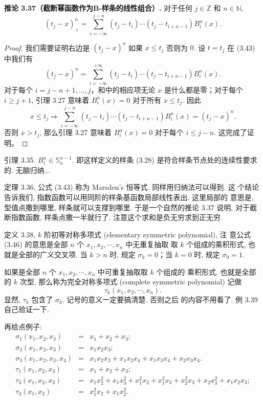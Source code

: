 \documentclass[a4paper]{ctexart}
\begin{document}
{\noindent \textbf{推论 3.37（截断幂函数作为B-样条的线性组合）.} 对于任何 $j \in \mathbb{Z}$ 和 $n \in \mathbb{N}$,
\[
(t_j - x)_+^n = \sum_{i=-\infty}^{j-n} (t_j - t_i) \cdots (t_j - t_{i+n-1}) B_i^n(x). \tag{3.45}
\]

\begin{proof}
我们需要证明右边是 $(t_j - x)^n$ 如果 $x \leq t_j$ 否则为 $0$. 设 $t=t_j$ 在 (3.43) 中我们有
\[
  (t_j - x)^n = \sum_{i=-\infty}^{+\infty} (t_j - t_i) \cdots (t_j - t_{i+n-1}) B_i^n(x).
\]
对于每个 $i = j - n + 1, \ldots, j$，和中的相应项无论 $x$ 是什么都是零；对于每个 $i \geq j + 1$, 引理 3.27 意味着 $B_i^n(x) = 0$ 对于所有 $x \leq t_j$. 
因此
\[
  x \leq t_j \Longrightarrow \sum_{i=-\infty}^{j-n} (t_j - t_i) \cdots (t_j - t_{i+n-1}) B_i^n(x) = (t_j - x)^n.
\]
否则 $x > t_j$, 那么引理 3.27 意味着 $B_i^n(x) = 0$ 对于每个 $i \leq j - n$. 这完成了证明。
\end{proof}

引理 3.35. $B_i^n \in \mathbb{S}_n^{n - 1}$. 即这样定义的样条 (3.28)
是符合样条节点处的连续性要求的. 无脑归纳...

定理 3.36, 公式 (3.43) 称为 Marsden's 恒等式. 同样用归纳法可以得到. 这
个结论告诉我们, 指数函数可以用同阶的样条基函数局部线性表出. 这里局部的
意思是, 型值点撒到哪里, 样条就可以支撑到哪里. 于是一个自然的推论 3.37
说明, 对于截断指数函数, 样条点撒一半就行了. 注意这个求和是负无穷求到正无穷.

定义 3.38, $k$ 阶初等对称多项式 (elementary symmetric polynomial), 注
意公式(3.46) 的意思是全部 $n$ 个 $x_1, x_2, \cdots, x_n$ 中无重复抽取
取 $k$ 个组成的乘积形式, 也就是全部的广义交叉项. 当 $k > n$ 时,
规定 $\sigma_k = 0$；当 $k = 0$ 时, 规定 $\sigma_0 = 1$.

如果是全部 $n$ 个 $x_1, x_2, \cdots, x_n$ 中可重复抽取取 $k$ 个组成的
乘积形式, 也就是全部的 $k$ 次型, 那么称为完全对称多项式 (complete
symmetric polynomial) 记做
$$
\tau_k(x_1, x_2, \cdots, x_n).
$$
显然, $\tau_k$ 包含了 $\sigma_k$. 记号的意义一定要搞清楚. 否则之后
的内容不用看了. 例 3.39 自己验证一下.

再给点例子:
$$
\begin{array}{rcl}
  \sigma_1(x_1, x_2, x_3) &=& x_1 + x_2 + x_3; \\
  \sigma_3(x_1, x_2, x_3) &=& x_1x_2x_3; \\
  \sigma_3(x_1, x_2, x_3, x_4) &=& x_1x_2x_3 + x_1x_2x_4 + x_1x_3x_4 + x_2x_3x_4.\\
  \tau_1(x_1, x_2, x_3) &=& x_1 + x_2 + x_3;\\
  \tau_3(x_1, x_2, x_3) &=& x_1x_2^2 + x_1x_3^2 + x_1^2x_2 + x_1^2x_3 + x_2^2x_3 + x_2x_3^2 + x_1x_2x_3;\\
  \tau_3(x_1, x_2) &=& x_1^2x_2 + x_1x_2^2.
\end{array}
$$

}
\end{document}
